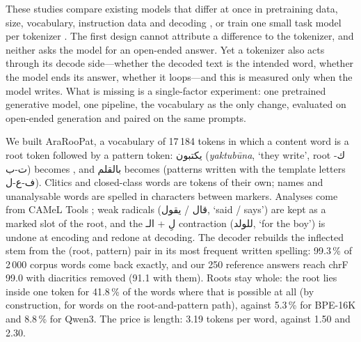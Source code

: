 These studies compare existing models that differ at once in pretraining data, size, vocabulary, instruction data and
decoding \citep{alakeel2026morphemes,reda2026yallamorph}, or train one small task model per tokenizer
\citep{alrefaie2024exploring}. The first design cannot attribute a difference to the tokenizer, and neither asks the
model for an open-ended answer. Yet a tokenizer also acts through its decode side---whether the decoded text is the
intended word, whether the model ends its answer, whether it loops---and this is measured only when the model writes.
What is missing is a single-factor experiment: one pretrained generative model, one pipeline, the vocabulary as the
only change, evaluated on open-ended generation and paired on the same prompts.

We built AraRooPat, a vocabulary of 17\,184 tokens in which a content word is a root token followed by a pattern
token: \textarabic{يكتبون} (\textit{yaktub\=una}, `they write', root \textarabic{ك-ت-ب}) becomes 
, and \textarabic{بالقلم} becomes     (patterns
written with the template letters \textarabic{ف-ع-ل}). Clitics and closed-class words are tokens of their own; names
and unanalysable words are spelled in characters between markers. Analyses come from CAMeL Tools
\citep{obeid-etal-2020-camel}; weak radicals (\textarabic{قال} / \textarabic{يقول}, `said / says') are kept as a marked
slot of the root, and the \textarabic{لِ} + \textarabic{الـ} contraction (\textarabic{للولد}, `for the boy') is undone
at encoding and redone at decoding. The decoder rebuilds the inflected stem from the (root, pattern) pair in its most
frequent written spelling: 99.3\,\% of 2\,000 corpus words come back exactly, and our 250 reference answers reach chrF
99.0 with diacritics removed (91.1 with them). Roots stay whole: the root lies inside one token for 41.8\,\% of the
words where that is possible at all (by construction, for words on the root-and-pattern path), against 5.3\,\% for
BPE-16K and 8.8\,\% for Qwen3. The price is length: 3.19 tokens per word, against 1.50 and 2.30.

